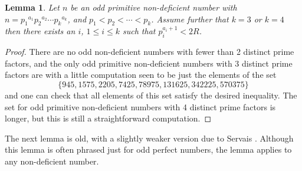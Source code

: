 \documentclass[12pt,reqno]{article}
\theoremstyle{plain}
\newtheorem{lemma}[theorem]{Lemma}
\theoremstyle{definition}
\theoremstyle{remark}
\begin{document}
\begin{lemma}   Let $n$ be an odd primitive non-deficient number with $n={p_1}^{a_1}{p_2}^{a_2} \cdots {p_k}^{a_k}$, 
and $p_1 < p_2 < \cdots < p_k$. Assume further that $k=3$ or $k=4$
then there exists an $i$, $1 \leq i \leq k$ such that $p_i^{a_i+1} < 2R$.
 \label{Checkforexactly3or4distinctprimefactors}
\end{lemma}
\begin{proof} There are no odd non-deficient numbers with fewer than 2 distinct prime factors, and the only odd primitive non-deficient numbers with 3 distinct prime factors are with a little computation seen to be just the elements of the set  $$\{945, 1575, 2205, 7425, 78975, 131625, 342225, 570375\}$$ and one can check that all elements of this set satisfy the desired inequality. The set for odd primitive non-deficient numbers with 4 distinct prime factors is longer, but this is still a straightforward computation.
\end{proof}

The next lemma is old, with a slightly weaker version due to Servais \cite{Servais}. Although this lemma is often phrased just for odd perfect numbers, the lemma applies to any non-deficient number. 
\end{document}
